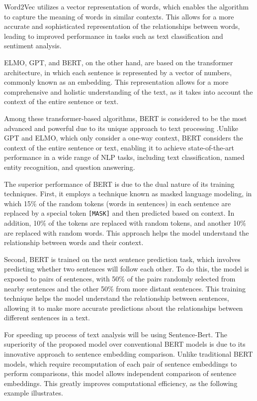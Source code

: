 \documentclass[PI]{ProjectProposal}
\begin{document}
Word2Vec utilizes a vector representation of words, which enables the algorithm to capture the meaning of words in similar contexts. This allows for a more accurate and sophisticated representation of the relationships between words, leading to improved performance in tasks such as text classification and sentiment analysis.

ELMO, GPT, and BERT, on the other hand, are based on the transformer architecture, in which each sentence is represented by a vector of numbers, commonly known as an embedding. This representation allows for a more comprehensive and holistic understanding of the text, as it takes into account the context of the entire sentence or text.

Among these transformer-based algorithms, BERT is considered to be the most advanced and powerful due to its unique approach to text processing \autocite{devlin2018bert}.Unlike GPT and ELMO, which only consider a one-way context, BERT considers the context of the entire sentence or text, enabling it to achieve state-of-the-art performance in a wide range of NLP tasks, including text classification, named entity recognition, and question answering.

The superior performance of BERT is due to the dual nature of its training techniques. First, it employs a technique known as masked language modeling, in which 15\% of the random tokens (words in sentences) in each sentence are replaced by a special token \texttt{[MASK]} and then predicted based on context. In addition, 10\% of the tokens are replaced with random tokens, and another 10\% are replaced with random words. This approach helps the model understand the relationship between words and their context.

Second, BERT is trained on the next sentence prediction task, which involves predicting whether two sentences will follow each other. To do this, the model is exposed to pairs of sentences, with 50\% of the pairs randomly selected from nearby sentences and the other 50\% from more distant sentences. This training technique helps the model understand the relationship between sentences, allowing it to make more accurate predictions about the relationships between different sentences in a text.

For speeding up process of text analysis will be using Sentence-Bert\autocite{reimers-2019-sentence-bert}. The superiority of the proposed model over conventional BERT models is due to its innovative approach to sentence embedding comparison. Unlike traditional BERT models, which require recomputation of each pair of sentence embeddings to perform comparisons, this model allows independent comparison of sentence embeddings. This greatly improves computational efficiency, as the following example illustrates.
\end{document}
